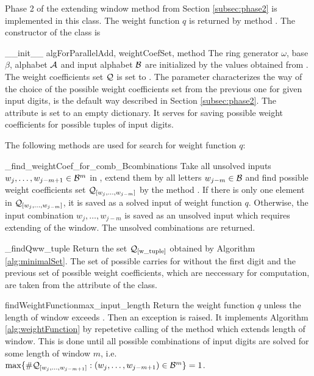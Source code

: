\begin{upravit}
Phase 2 of the extending window method from Section \ref{subsec:phase2} is implemented in this class. The weight function $q$ is returned by method . The constructor of the class is

\begin{method}{\_\_init\_\_}{ algForParallelAdd, weightCoefSet, method}
The ring generator $\omega$, base $\beta$, alphabet $\mathcal{A}$ and input alphabet $\mathcal{B}$ are initialized by the values obtained from . The weight coefficients set $\mathcal{Q}$ is set to . The parameter  characterizes the way of the choice of the possible weight coefficients set from the previous one for given input digits,  is the default way described in Section \ref{subsec:phase2}. The attribute  is set to an empty dictionary. It serves for saving possible weight coefficients for possible tuples of input digits.
\end{method}

The following methods are used for search for weight function $q$:

\begin{method}{\_find\_weightCoef\_for\_comb\_B}{combinations}
Take all unsolved inputs $w_j,\dots, w_{j-m+1} \in \mathcal{B}^m$ in , extend them by all letters $w_{j-m}\in\mathcal{B}$ and find possible weight coefficients set $\mathcal{Q}_{[w_j,\dots, w_{j-m}]}$ by the method . If there is only one element in $\mathcal{Q}_{[w_j,\dots, w_{j-m}]}$, it is saved as a solved input of weight function $q$. Otherwise, the input combination $w_j,\dots, w_{j-m}$ is saved as an unsolved input which requires extending of the window. The unsolved combinations are returned.  
\end{method}


\begin{method}{\_findQw}{w\_tuple}
Return the set $\mathcal{Q}_{[\text{w\_tuple}]}$ obtained by Algorithm \ref{alg:minimalSet}. The set of possible carries for  without the first digit and the previous set of possible weight coefficients, which are neccessary for computation, are taken from the attribute  of the class.
\end{method}


\begin{method}{findWeightFunction}{max\_input\_length}
Return the weight function $q$ unless the length of window exceeds . Then an exception is raised. It implements Algorithm \ref{alg:weightFunction} by repetetive calling of the method  which extends length of window. This is done until all possible combinations of input digits are solved for some length of window $m$, i.e. $\max\{\#\mathcal{Q}_{[w_j,\dots, w_{j-m+1}]}:(w_j,\dots, w_{j-m+1}) \in \mathcal{B}^m \} = 1$.
\end{method}



\end{upravit}
